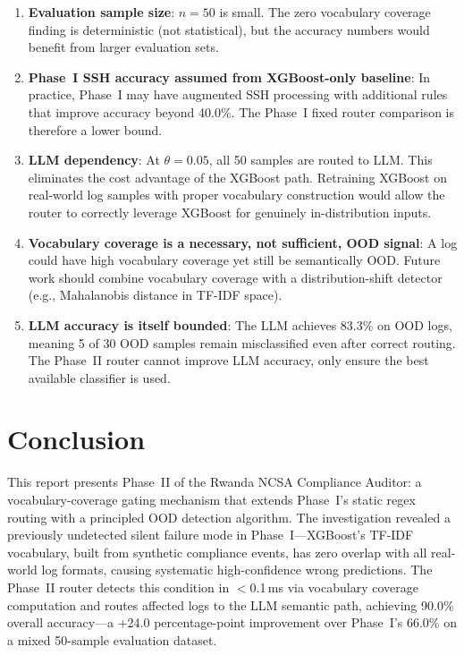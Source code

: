 \documentclass[11pt,conference]{IEEEtran}
\begin{document}
\begin{enumerate}
    \item \textbf{Evaluation sample size}: $n=50$ is small. The zero
    vocabulary coverage finding is deterministic (not statistical), but the
    accuracy numbers would benefit from larger evaluation sets.

    \item \textbf{Phase~I SSH accuracy assumed from XGBoost-only baseline}:
    In practice, Phase~I may have augmented SSH processing with additional
    rules that improve accuracy beyond 40.0\%. The Phase~I fixed router
    comparison is therefore a lower bound.

    \item \textbf{LLM dependency}: At $\theta = 0.05$, all 50 samples are
    routed to LLM. This eliminates the cost advantage of the XGBoost path.
    Retraining XGBoost on real-world log samples with proper vocabulary
    construction would allow the router to correctly leverage XGBoost for
    genuinely in-distribution inputs.

    \item \textbf{Vocabulary coverage is a necessary, not sufficient, OOD
    signal}: A log could have high vocabulary coverage yet still be
    semantically OOD. Future work should combine vocabulary coverage with a
    distribution-shift detector (e.g., Mahalanobis distance in TF-IDF space).

    \item \textbf{LLM accuracy is itself bounded}: The LLM achieves 83.3\%
    on OOD logs, meaning 5 of 30 OOD samples remain misclassified even after
    correct routing. The Phase~II router cannot improve LLM accuracy, only
    ensure the best available classifier is used.
\end{enumerate}

\section{Conclusion}

This report presents Phase~II of the Rwanda NCSA Compliance Auditor: a
vocabulary-coverage gating mechanism that extends Phase~I's static regex
routing with a principled OOD detection algorithm. The investigation revealed
a previously undetected silent failure mode in Phase~I---XGBoost's TF-IDF
vocabulary, built from synthetic compliance events, has zero overlap with
all real-world log formats, causing systematic high-confidence wrong
predictions. The Phase~II router detects this condition in $<$0.1\,ms via
vocabulary coverage computation and routes affected logs to the LLM semantic
path, achieving 90.0\% overall accuracy---a +24.0 percentage-point
improvement over Phase~I's 66.0\% on a mixed 50-sample evaluation dataset.
\end{document}
